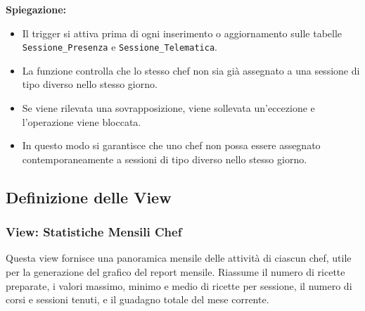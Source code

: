 \textbf{Spiegazione:}
\begin{itemize}
    \item Il trigger si attiva prima di ogni inserimento o aggiornamento sulle tabelle \texttt{Sessione\_Presenza} e \texttt{Sessione\_Telematica}.
    \item La funzione controlla che lo stesso chef non sia già assegnato a una sessione di tipo diverso nello stesso giorno.
    \item Se viene rilevata una sovrapposizione, viene sollevata un'eccezione e l'operazione viene bloccata.
    \item In questo modo si garantisce che uno chef non possa essere assegnato contemporaneamente a sessioni di tipo diverso nello stesso giorno.
\end{itemize}

\subsection{Definizione delle View}

\subsubsection{View: Statistiche Mensili Chef}

Questa view fornisce una panoramica mensile delle attività di ciascun chef, utile per la generazione del grafico del report mensile. Riassume il numero di ricette preparate, i valori massimo, minimo e medio di ricette per sessione, il numero di corsi e sessioni tenuti, e il guadagno totale del mese corrente.


